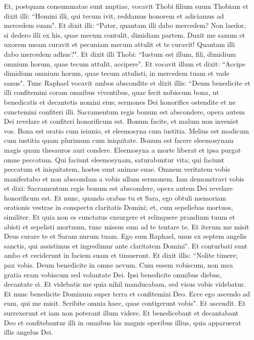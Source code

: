 \begin{biblechapter}  
\verse Et, postquam consummatae sunt nuptiae, vocavit Thobi filium suum Thobiam et dixit illi: “Homini illi, qui tecum ivit, reddamus honorem et adiciamus ad mercedem suam". 
\verse Et dixit illi: “Pater, quantam illi dabo mercedem? Non laedor, si dedero illi ex his, quae mecum contulit, dimidiam partem. 
\verse Duxit me sanum et uxorem meam curavit et pecuniam mecum attulit et te curavit! Quantam illi dabo mercedem adhuc?". 
\verse Et dixit illi Thobi: “Iustum est illum, fili, dimidium omnium horum, quae tecum attulit, accipere". 
\verse Et vocavit illum et dixit: “Accipe dimidium omnium horum, quae tecum attulisti, in mercedem tuam et vade sanus". 
\verse Tunc Raphael vocavit ambos abscondite et dixit illis: “Deum benedicite et illi confitemini coram omnibus viventibus, quae fecit nobiscum bona, ut benedicatis et decantetis nomini eius; sermones Dei honorifice ostendite et ne cunctemini confiteri illi. 
\verse Sacramentum regis bonum est abscondere, opera autem Dei revelare et confiteri honorificum est. Bonum facite, et malum non inveniet vos. 
\verse Bona est oratio cum ieiunio, et eleemosyna cum iustitia. Melius est modicum cum iustitia quam plurimum cum iniquitate. Bonum est facere eleemosynam magis quam thesauros auri condere.  
\verse Eleemosyna a morte liberat et ipsa purgat omne peccatum. Qui faciunt eleemosynam, saturabuntur vita; 
\verse qui faciunt peccatum et iniquitatem, hostes sunt animae suae. 
\verse Omnem veritatem vobis manifestabo et non abscondam a vobis ullum sermonem. Iam demonstravi vobis et dixi: Sacramentum regis bonum est abscondere, opera autem Dei revelare honorificum est. 
\verse Et nunc, quando orabas tu et Sara, ego obtuli memoriam orationis vestrae in conspectu claritatis Domini; et, cum sepeliebas mortuos, similiter. 
\verse Et quia non es cunctatus exsurgere et relinquere prandium tuum et abisti et sepelisti mortuum, tunc missus sum ad te tentare te. 
\verse Et iterum me misit Deus curare te et Saram nurum tuam. 
\verse Ego sum Raphael, unus ex septem angelis sanctis, qui assistimus et ingredimur ante claritatem Domini". 
\verse Et conturbati sunt ambo et ceciderunt in faciem suam et timuerunt. 
\verse Et dixit illis: “Nolite timere; pax vobis. Deum benedicite in omne aevum. 
\verse Cum essem vobiscum, non mea gratia eram vobiscum sed voluntate Dei. Ipsi benedicite omnibus diebus, decantate ei. 
\verse Et videbatis me quia nihil manducabam, sed visus vobis videbatur. 
\verse Et nunc benedicite Dominum super terra et confitemini Deo. Ecce ego ascendo ad eum, qui me misit. Scribite omnia haec, quae contigerunt vobis". Et ascendit. 
\verse Et surrexerunt et iam non poterant illum videre. 
\verse Et benedicebant et decantabant Deo et confitebantur illi in omnibus his magnis operibus illius, quia apparuerat illis angelus Dei. 
\end{biblechapter}

